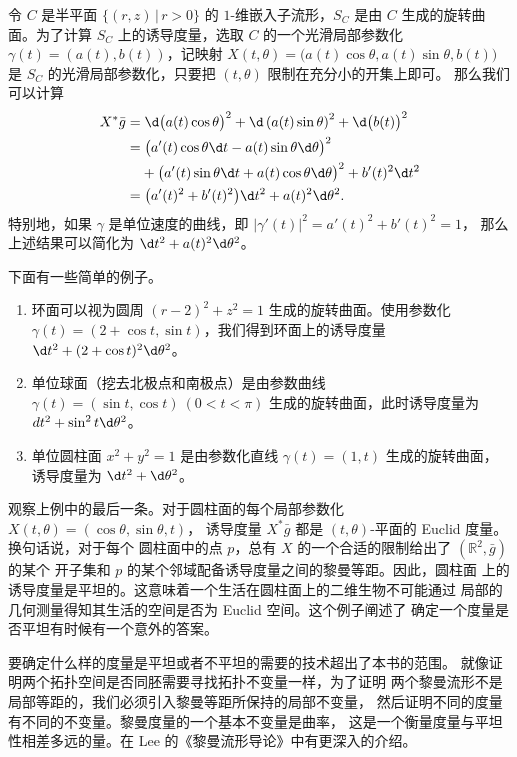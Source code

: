 \begin{example}[旋转曲面上的诱导度量]\label{exa:metric on surface}
  令 $C$ 是半平面 $\{(r,z)\,|\, r >0\}$ 的 $1$-维嵌入子流形，$S_C$
  是由 $C$ 生成的旋转曲面。为了计算 $S_C$ 上的诱导度量，选取 $C$
  的一个光滑局部参数化 $\gamma(t)=(a(t),b(t))$，记映射
  $X(t,\theta)=\bigl(a(t)\cos\theta,a(t)\sin\theta,b(t)\bigr)$ 是
  $S_C$ 的光滑局部参数化，只要把 $(t,\theta)$ 限制在充分小的开集上即可。
  那么我们可以计算
  \begin{align*}
    X^*\bar g&=\d\bigl(a(t)\cos\theta\bigr)^2+\d\left(a(t)\sin\theta\right)^2
    +\d \bigl(b(t)\bigr)^2\\
    &=\bigl(a'(t)\cos\theta \d t-a(t)\sin\theta \d\theta\bigr)^2\\
    &\hphantom{{}=}+\bigl(a'(t)\sin\theta\d t+a(t)\cos\theta \d\theta\bigr)^2 
    +b'(t)^2\d t^2\\
    &=\bigl(a'(t)^2+b'(t)^2\bigr)\d t^2+a(t)^2\d\theta^2.
  \end{align*}
  特别地，如果 $\gamma$ 是单位速度的曲线，即 $|\gamma'(t)|^2=a'(t)^2+b'(t)^2=1$，
  那么上述结果可以简化为 $\d t^2+a(t)^2\d\theta^2$。

  下面有一些简单的例子。
  \begin{enumerate}
    \item 环面可以视为圆周 $(r-2)^2+z^2=1$ 生成的旋转曲面。使用参数化
    $\gamma(t)=(2+\cos t,\sin t)$，我们得到环面上的诱导度量
    $\d t^2+(2+\cos t)^2\d\theta^2$。
    \item 单位球面（挖去北极点和南极点）是由参数曲线 $\gamma(t)=(\sin t,\cos t)\ (0<t<\pi)$
    生成的旋转曲面，此时诱导度量为 $dt^2+\sin^2 t\d\theta^2$。
    \item 单位圆柱面 $x^2+y^2=1$ 是由参数化直线 $\gamma(t)=(1,t)$ 生成的旋转曲面，
    诱导度量为 $\d t^2+\d\theta^2$。
  \end{enumerate}
\end{example}

观察上例中的最后一条。对于圆柱面的每个局部参数化 $X(t,\theta)=(\cos\theta,\sin\theta,t)$，
诱导度量 $X^*\bar g$ 都是 $(t,\theta)$-平面的 Euclid 度量。换句话说，对于每个
圆柱面中的点 $p$，总有 $X$ 的一个合适的限制给出了 $(\mathbb R^2,\bar g)$ 的某个
开子集和 $p$ 的某个邻域配备诱导度量之间的黎曼等距。因此，圆柱面
上的诱导度量是平坦的。这意味着一个生活在圆柱面上的二维生物不可能通过
局部的几何测量得知其生活的空间是否为 Euclid 空间。这个例子阐述了
确定一个度量是否平坦有时候有一个意外的答案。

要确定什么样的度量是平坦或者不平坦的需要的技术超出了本书的范围。
就像证明两个拓扑空间是否同胚需要寻找拓扑不变量一样，为了证明
两个黎曼流形不是局部等距的，我们必须引入黎曼等距所保持的局部不变量，
然后证明不同的度量有不同的不变量。黎曼度量的一个基本不变量是曲率，
这是一个衡量度量与平坦性相差多远的量。在 Lee 的《黎曼流形导论》中有更深入的介绍。


